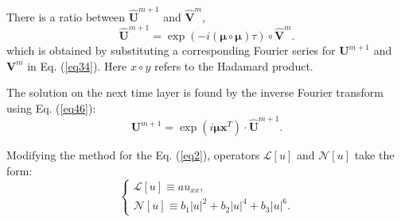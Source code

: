 \documentclass[preprint,12pt]{elsarticle}
\begin{document}
There is a ratio between \(\hat{\boldsymbol{U}}^{m+1}\) and \(\hat{\boldsymbol{V}}^{m}\),
\begin{equation} \label{eq46}
\hat{\boldsymbol{U}}^{m+1}=\exp\left(-i \left(\boldsymbol{\mu}\circ \boldsymbol{\mu}\right) \tau\right)\circ \hat{\boldsymbol{V}}^{m}.
\end{equation}
which is obtained by substituting a corresponding Fourier series for \(\boldsymbol{U}^{m+1}\) and \(\boldsymbol{V}^{m}\) in Eq. (\ref{eq34}). Here \(x\circ y\) refers to the Hadamard product.

The solution on the next time layer is found by the inverse Fourier transform using Eq. (\ref{eq46}):
\begin{equation} 
\boldsymbol{U}^{m+1}=\exp\left(i \boldsymbol{\mu} \boldsymbol{x}^{T}\right)\cdot \hat{\boldsymbol{U}}^{m+1}.
\end{equation}

Modifying the method for the Eq. (\ref{eq2}), operators \(\mathscr{L} [u]\) and \(\mathscr{N}[u]\) take the form:
\begin{equation}
\begin{cases}
\mathscr{L} [u] \equiv a u_{xx},  \\
\mathscr{N} [u] \equiv b_{1}|u|^2+ b_{2}|u|^4+ b_{3}|u|^6.
\end{cases}
\end{equation}
\end{document}
